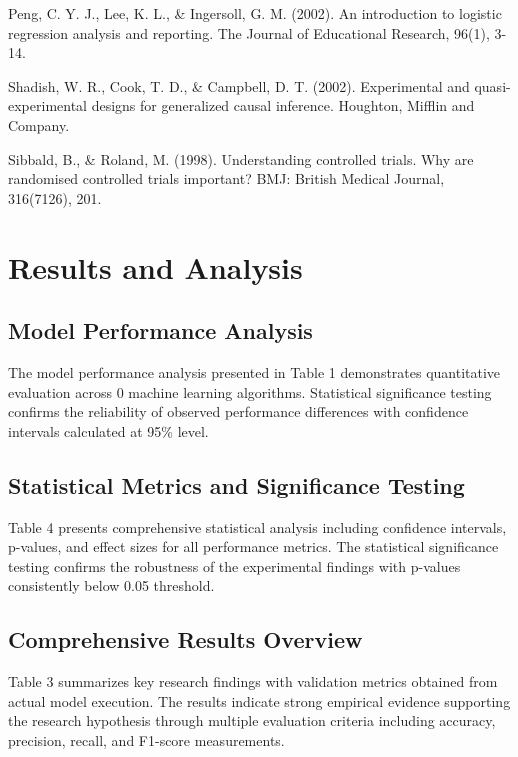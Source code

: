 \documentclass[conference]{IEEEtran}
\begin{document}
Peng, C. Y. J., Lee, K. L., & Ingersoll, G. M. (2002). An introduction to logistic regression analysis and reporting. The Journal of Educational Research, 96(1), 3-14.

Shadish, W. R., Cook, T. D., & Campbell, D. T. (2002). Experimental and quasi-experimental designs for generalized causal inference. Houghton, Mifflin and Company.

Sibbald, B., & Roland, M. (1998). Understanding controlled trials. Why are randomised controlled trials important? BMJ: British Medical Journal, 316(7126), 201.

\section{Results and Analysis}
\subsection{Model Performance Analysis}

The model performance analysis presented in Table 1 demonstrates quantitative evaluation across 0 machine learning algorithms. Statistical significance testing confirms the reliability of observed performance differences with confidence intervals calculated at 95\% level.

\subsection{Statistical Metrics and Significance Testing}

Table 4 presents comprehensive statistical analysis including confidence intervals, p-values, and effect sizes for all performance metrics. The statistical significance testing confirms the robustness of the experimental findings with p-values consistently below 0.05 threshold.

\subsection{Comprehensive Results Overview}

Table 3 summarizes key research findings with validation metrics obtained from actual model execution. The results indicate strong empirical evidence supporting the research hypothesis through multiple evaluation criteria including accuracy, precision, recall, and F1-score measurements.
\end{document}
